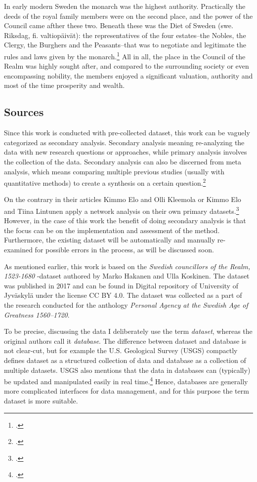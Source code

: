 In early modern Sweden the monarch was the highest authority. Practically the deeds of the royal family members were on the second place, and the power of the Council came afther these two. Beneath these was the Diet of Sweden (swe. Riksdag, fi. valtiopäivät): the representatives of the four estates–the Nobles, the Clergy, the Burghers and the Peasants–that was to negotiate and legitimate the rules and laws given by the monarch.\footcite[pp. 57-61.]{pSuurvalta}  All in all, the place in the Council of the Realm was highly sought after, and compared to the surrounding society or even encompassing nobility, the members enjoyed a significant valuation, authority and most of the time prosperity and wealth.

\subsection{Sources}
\label{sources}
Since this work is conducted with pre-collected dataset, this work can be vaguely categorized as secondary analysis. Secondary analysis meaning re-analyzing the data with new research questions or approaches, while primary analysis involves the collection of the data. Secondary analysis can also be discerned from meta analysis, which means comparing multiple previous studies (usually with quantitative methods) to create a synthesis on a certain question.\footcite[pp. 4-5.]{meta-analysis} 

On the contrary in their articles Kimmo Elo and Olli Kleemola or Kimmo Elo and Tiina Lintunen apply a network analysis on their own primary datasets.\footcites{eloAklee15}{LintunenAndElo2019} However, in the case of this work the benefit of doing secondary analysis is that the focus can be on the implementation and assessment of the method. Furthermore, the existing dataset will be automatically and manually re-examined for possible errors in the process, as will be discussed soon.

As mentioned earlier, this work is based on the \textit{Swedish councillors of the Realm, 1523-1680} -dataset authored by Marko Hakanen and Ulla Koskinen. The dataset was published in 2017 and can be found in Digital repository of University of Jyväskylä under the license CC BY 4.0. The dataset was collected as a part of the research conducted for the anthology \textit{Personal Agency at the Swedish Age of Greatness 1560–1720}.

To be precise, discussing the data I deliberately use the term \textit{dataset}, whereas the original authors call it \textit{database}. The difference between dataset and database is not clear-cut, but for example the U.S. Geological Survey (USGS) compactly defines dataset as a structured collection of data and database as a collection of multiple datasets. USGS also mentions that the data in databases can (typically) be updated and manipulated easily in real time.\footcite{usgs} Hence, databases are generally more complicated interfaces for data management, and for this purpose the term dataset is more suitable.

